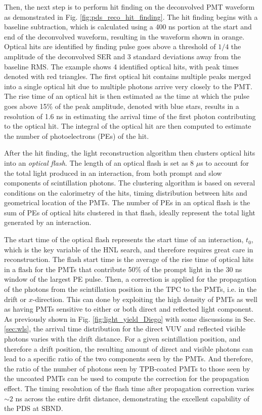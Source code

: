 Then, the next step is to perform hit finding on the deconvolved PMT waveform as demonstrated in Fig. \ref{fig:pds_reco_hit_finding}.
The hit finding begins with a baseline subtraction, which is calculated using a 400 ns portion at the start and end of the deconvolved waveform, resulting in the waveform shown in orange.
Optical hits are identified by finding pulse goes above a threshold of $1/4$ the amplitude of the deconvolved SER and 3 standard deviations away from the baseline RMS.
The example shows 4 identified optical hits, with peak times denoted with red triangles.
The first optical hit contains multiple peaks merged into a single optical hit due to multiple photons arrive very closely to the PMT.
The rise time of an optical hit is then estimated as the time at which the pulse goes above 15\% of the peak  amplitude, denoted with blue stars, results in a resolution of 1.6 ns  in estimating the arrival time of the first photon contributing to the optical hit.
The integral of the optical hit are then computed to estimate the number of photoelectrons (PEs) of the hit.

After the hit finding, the light reconstruction algorithm then clusters optical hits into an \textit{optical flash}.
The length of an optical flash is set as 8 $\mu$s to account for the total light produced in an interaction, from both prompt and slow components of scintillation photons.
The clustering algorithm is based on several conditions on the calorimetry of the hits, timing distribution between hits and geometrical location of the PMTs.
The number of PEs in an optical flash is the sum of PEs of optical hits clustered in that flash, ideally represent the total light generated by an interaction. 

The start time of the optical flash represents the start time of an interaction, $t_0$, which is the key variable of the HNL search, and therefore requires great care in reconstruction.
The flash start time is the average of the rise time of optical hits in a flash for the PMTs that contribute 50\% of the prompt light in the 30 ns window of the largest PE pulse. 
Then, a correction is applied for the propagation of the photons from the scintillation position in the TPC to the PMTs, i.e. in the drift or $x$-direction.
This can done by exploiting the high density of PMTs as well as having PMTs sensitive to either or both direct and reflected light component.
As previously shown in Fig. \ref{fig:light_yield_Diego} with some discussions in Sec. \ref{sec:wls}, the arrival time distribution for the direct VUV and reflected visible photons varies with the drift distance.
For a given scintillation position, and therefore a drift position, the resulting amount of direct and visible photons can lead to a specific ratio of the two components seen by the PMTs.
And therefore, the ratio of the number of photons seen by TPB-coated PMTs to those seen by the uncoated PMTs can be used to compute the correction for the propagation effect.
The timing resolution of the flash time after propagation correction varies $\sim 2$ ns across the entire drfit distance, demonstrating the excellent capability of the PDS at SBND.

